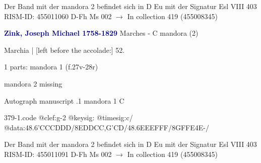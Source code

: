 \documentclass[twocolumn]{book}
\begin{document}
\newline Der Band mit der mandora 2 befindet sich in D Eu mit der Signatur Esl VIII 403
\newline RISM-ID: 455011060
\newline D-Fh  Ms 002
\newline $\rightarrow$ In collection 419 (455008345)
      
\newline \par \vspace{7pt} \textcolor{darkblue}{\textbf{Zink, Joseph Michael  1758-1829}}
\newline Marches - C
\newline mandora (2)
\newline \begin{itshape}[f.27v, at left:] Marchia | [left before the accolade:] 52.\end{itshape} 
\newline \textcolor{darkblue}{}  1 parts: mandora 1  (f.27v-28r)
\newline \begin{small} mandora 2 missing\end{small} 
\newline Autograph manuscript
.1  mandora 1  C  
\begin{filecontents*}{379-1.code}
@clef:g-2
@keysig:
@timesig:c/
@data:48.6'C{CC}D{DD}/{8EDDC}{C,G'CD}/48.6E{EE}F{FF}/{8GFFE}4E-/
\end{filecontents*}
\newline
%

\newline Der Band mit der mandora 2 befindet sich in D Eu mit der Signatur Esl VIII 403
\newline RISM-ID: 455011091
\newline D-Fh  Ms 002
\newline $\rightarrow$ In collection 419 (455008345)
      
\end{document}
